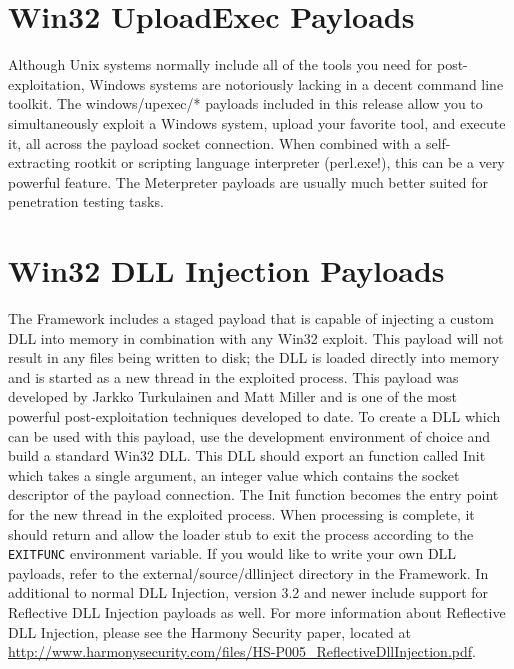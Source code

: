 \documentclass{report}
\begin{document}
\section{Win32 UploadExec Payloads}
\par
Although Unix systems normally include all of the tools you need for
post-exploitation, Windows systems are notoriously lacking in a decent command
line toolkit. The windows/upexec/* payloads included in this release allow you to
simultaneously exploit a Windows system, upload your favorite tool, and execute
it, all across the payload socket connection. When combined with a
self-extracting rootkit or scripting language interpreter (perl.exe!), this can
be a very powerful feature. The Meterpreter payloads are usually much better
suited for penetration testing tasks.  

\section{Win32 DLL Injection Payloads}
\par
The Framework includes a staged payload that is
capable of injecting a custom DLL into memory in combination with any Win32
exploit. This payload will not result in any files being written to disk; the
DLL is loaded directly into memory and is started as a new thread in the
exploited process. This payload was developed by Jarkko Turkulainen and Matt
Miller and is one of the most powerful post-exploitation techniques developed
to date. To create a DLL which can be used with this payload, use the
development environment of choice and build a standard Win32 DLL. This DLL
should export an function called Init which takes a single argument, an
integer value which contains the socket descriptor of the payload connection.
The Init function becomes the entry point for the new thread in the exploited
process. When processing is complete, it should return and allow the loader
stub to exit the process according to the \texttt{EXITFUNC} environment
variable. If you would like to write your own DLL payloads, refer to the
external/source/dllinject directory in the Framework. In additional to normal
DLL Injection, version 3.2 and newer include support for Reflective DLL Injection
payloads as well. For more information about Reflective DLL Injection, please see
the Harmony Security paper, located at 
\url{http://www.harmonysecurity.com/files/HS-P005_ReflectiveDllInjection.pdf}.
\end{document}
